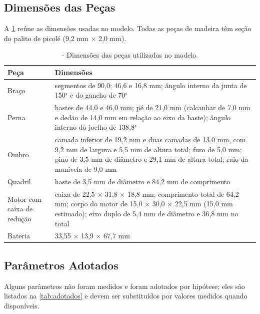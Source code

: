\subsection{Dimensões das Peças}

A \ref{tab:geometria} reúne as dimensões usadas no modelo. Todas as peças de madeira têm seção do palito de picolé (9,2 mm $\times$ 2,0 mm).

\begin{table}[H]
\centering
\caption{\label{tab:geometria}- Dimensões das peças utilizadas no modelo.}
\vspace*{.1cm}
\small
\begin{tabular}{|l|p{9.2cm}|}
\hline
\textbf{Peça} & \textbf{Dimensões} \\
\hline
Braço & segmentos de 90,0; 46,6 e 16,8 mm; ângulo interno da junta de 150$^\circ$ e do gancho de 70$^\circ$ \\
\hline
Perna & hastes de 44,0 e 46,0 mm; pé de 21,0 mm (calcanhar de 7,0 mm e dedão de 14,0 mm em relação ao eixo da haste); ângulo interno do joelho de 138,8$^\circ$ \\
\hline
Ombro & camada inferior de 19,2 mm e duas camadas de 13,0 mm, com 9,2 mm de largura e 5,5 mm de altura total; furo de 5,0 mm; pino de 3,5 mm de diâmetro e 29,1 mm de altura total; raio da manivela de 9,0 mm \\
\hline
Quadril & haste de 3,5 mm de diâmetro e 84,2 mm de comprimento \\
\hline
Motor com caixa de redução & caixa de 22,5 $\times$ 31,8 $\times$ 18,8 mm; comprimento total de 64,2 mm; corpo do motor de 15,0 $\times$ 30,0 $\times$ 22,5 mm (15,0 mm estimado); eixo duplo de 5,4 mm de diâmetro e 36,8 mm no total \\
\hline
Bateria & 33,55 $\times$ 13,9 $\times$ 67,7 mm \\
\hline
\end{tabular}
\end{table}

\subsection{Parâmetros Adotados}

Alguns parâmetros não foram medidos e foram adotados por hipótese; eles são listados na \ref{tab:adotados} e devem ser substituídos por valores medidos quando disponíveis.

